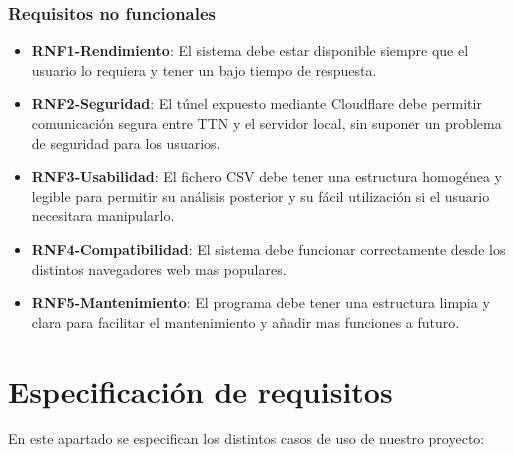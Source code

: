 \subsubsection{Requisitos no funcionales}

\begin{itemize}
    \item \textbf{RNF1-Rendimiento}: El sistema debe estar disponible siempre que el usuario lo requiera y tener un bajo tiempo de respuesta.
    \item \textbf{RNF2-Seguridad}: El túnel expuesto mediante Cloudflare debe permitir comunicación segura entre TTN y el servidor local, sin suponer un problema de seguridad para los usuarios.
    \item \textbf{RNF3-Usabilidad}: El fichero CSV debe tener una estructura homogénea y legible para permitir su análisis posterior y su fácil utilización si el usuario necesitara manipularlo.
    \item \textbf{RNF4-Compatibilidad}: El sistema debe funcionar correctamente desde los distintos navegadores web mas populares.
    \item \textbf{RNF5-Mantenimiento}: El programa debe tener una estructura limpia y clara para facilitar el mantenimiento y añadir mas funciones a futuro.
\end{itemize}
\section{Especificación de requisitos}
En este apartado se especifican los distintos casos de uso de nuestro proyecto:


